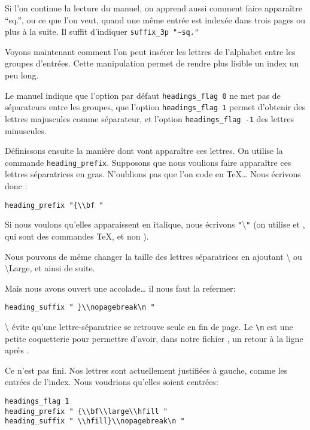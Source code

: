 Si l'on continue la lecture du manuel, on apprend aussi comment faire apparaître \enquote{sq.}, ou ce que l'on veut, quand une même entrée est indexée dans trois pages ou plus à la suite. Il suffit d'indiquer \verb+suffix_3p "~sq."+

Voyons maintenant comment l'on peut insérer les lettres de l'alphabet entre les groupes d'entrées. Cette manipulation permet de rendre plus lisible un index un peu long. 

Le manuel indique que l'option par défaut \verb+headings_flag 0+ ne met pas de séparateurs entre les groupes, que l'option \verb+headings_flag 1+ permet d'obtenir des lettres majuscules comme séparateur, et l'option  \verb+headings_flag -1+ des lettres minuscules.

Définissons ensuite la manière dont vont apparaître ces lettres. On utilise la commande \verb|heading_prefix|. Supposons que nous voulions faire apparaître ces lettres séparatrices en gras. N'oublions pas que l'on code en \TeX … Nous écrivons donc :

\begin{verbatim}
heading_prefix "{\\bf "
\end{verbatim} 

Si nous voulons qu'elles apparaissent en italique, nous écrivons \verb|"|\textbackslash{}\verb|"| (on utilise  et , qui sont des commandes \TeX, et non  ).

Nous  pouvons de même changer la taille des lettres séparatrices en ajoutant \textbackslash{} ou \cs\textbackslash{Large}, et ainsi de suite. 

Mais nous avons ouvert une accolade… il nous faut la refermer:

\begin{verbatim}
heading_suffix " }\\nopagebreak\n " 
\end{verbatim}

\textbackslash{} évite qu'une lettre-séparatrice se retrouve seule en fin de page. Le \verb|\n| est une petite coquetterie pour permettre d'avoir, dans notre fichier , un retour à la ligne après .



Ce n'est pas fini. Nos lettres sont actuellement justifiées à gauche, comme les entrées de l'index. Nous voudrions qu'elles soient centrées: 

\begin{verbatim}
headings_flag 1
heading_prefix " {\\bf\\large\\hfill " 
heading_suffix " \\hfill}\\nopagebreak\n " 
\end{verbatim}


